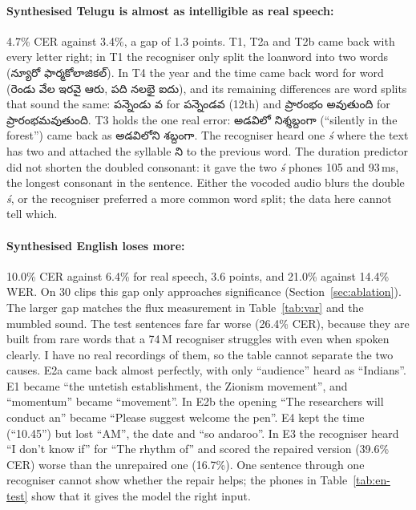 \documentclass[11pt,a4paper]{article}
\newcommand{\tel}[1]{{\te #1}}
\begin{document}
\paragraph{Synthesised Telugu is almost as intelligible as real speech:} 4.7\% CER against 3.4\%, a gap of
1.3 points. T1, T2a and T2b came back with every letter right; in T1 the recogniser only split the loanword into
two words (\tel{న్యూరో ఫార్మకోలాజికల్}). In T4 the year and the time came back word for word (\tel{రెండు వేల ఇరవై ఆరు}, \tel{పది నలభై ఐదు}), and its
remaining differences are word splits that sound the same: \tel{పన్నెండు వ} for \tel{పన్నెండవ} (12th) and
\tel{ప్రారంభం అవుతుంది} for \tel{ప్రారంభమవుతుంది}. T3 holds the one real error: \tel{అడవిలో నిశ్శబ్దంగా} (``silently in the forest'') came
back as \tel{అడవిలోని శబ్దంగా}. The recogniser heard one \emph{ś} where the text has two and attached the syllable
\tel{ని} to the previous word. The duration predictor did not shorten the doubled consonant: it gave the two
\emph{ś} phones 105 and 93\,ms, the longest consonant in the sentence. Either the vocoded audio blurs the double
\emph{ś}, or the recogniser preferred a more common word split; the data here cannot tell which.

\paragraph{Synthesised English loses more:} 10.0\% CER against 6.4\% for real speech, 3.6 points, and 21.0\%
against 14.4\% WER. On 30 clips this gap only approaches significance (Section~\ref{sec:ablation}). The larger
gap matches the flux measurement in Table~\ref{tab:var} and the mumbled sound.
The test sentences fare far worse (26.4\% CER), because they are built from rare words that a 74\,M recogniser
struggles with even when spoken clearly. I have no real recordings of them, so the table cannot separate the two
causes. E2a came back almost perfectly, with only ``audience'' heard as ``Indians''. E1 became ``the untetish
establishment, the Zionism movement'', and ``momentum'' became ``movement''. In E2b the opening ``The researchers
will conduct an'' became ``Please suggest welcome the pen''. E4 kept the time (``10.45'') but lost ``AM'', the date and ``so andaroo''. In
E3 the recogniser heard ``I don't know if'' for ``The rhythm of'' and scored the repaired version (39.6\% CER)
worse than the unrepaired one (16.7\%). One sentence through one recogniser cannot show whether the repair helps;
the phones in Table~\ref{tab:en-test} show that it gives the model the right input.
\end{document}
